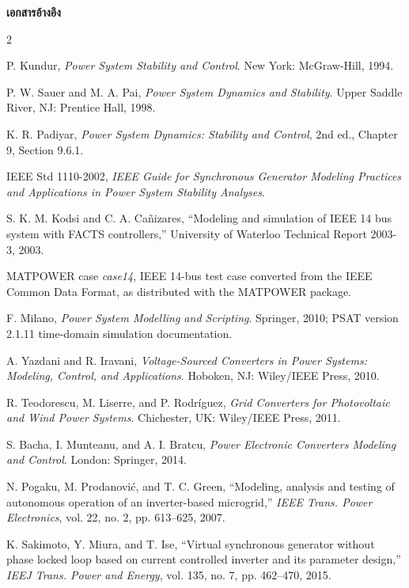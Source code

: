 \documentclass[12pt,a4paper]{article}
\newcommand{\templateheading}[1]{%
  \par\addvspace{0.85em}\noindent
  {\fontsize{19}{21}\selectfont\bfseries #1}\par
  \vspace{0.10em}\noindent{\color{academicblue}\rule{\textwidth}{0.9pt}}\par
  \vspace{0.30em}}
\begin{document}
\templateheading{เอกสารอ้างอิง}
\begin{multicols}{2}\scriptsize
\begin{enumerate}[label={[\arabic*]},leftmargin=1.8em,itemsep=0pt,topsep=0.1em]
\item\label{ref:kundur} P. Kundur, \emph{Power System Stability and Control}. New York: McGraw-Hill, 1994.
\item\label{ref:sauerpai} P. W. Sauer and M. A. Pai, \emph{Power System Dynamics and Stability}. Upper Saddle River, NJ: Prentice Hall, 1998.
\item\label{ref:padiyar} K. R. Padiyar, \emph{Power System Dynamics: Stability and Control}, 2nd ed., Chapter 9, Section 9.6.1.
\item\label{ref:ieee1110} IEEE Std 1110-2002, \emph{IEEE Guide for Synchronous Generator Modeling Practices and Applications in Power System Stability Analyses}.
\item\label{ref:kodsi} S. K. M. Kodsi and C. A. Ca\~{n}izares, ``Modeling and simulation of IEEE 14 bus system with FACTS controllers,'' University of Waterloo Technical Report 2003-3, 2003.
\item\label{ref:matpower} MATPOWER case \emph{case14}, IEEE 14-bus test case converted from the IEEE Common Data Format, as distributed with the MATPOWER package.
\item\label{ref:psat} F. Milano, \emph{Power System Modelling and Scripting}. Springer, 2010; PSAT version 2.1.11 time-domain simulation documentation.
\item\label{ref:yazdani} A. Yazdani and R. Iravani, \emph{Voltage-Sourced Converters in Power Systems: Modeling, Control, and Applications}. Hoboken, NJ: Wiley/IEEE Press, 2010.
\item\label{ref:teodorescu} R. Teodorescu, M. Liserre, and P. Rodr\'{i}guez, \emph{Grid Converters for Photovoltaic and Wind Power Systems}. Chichester, UK: Wiley/IEEE Press, 2011.
\item\label{ref:bacha} S. Bacha, I. Munteanu, and A. I. Bratcu, \emph{Power Electronic Converters Modeling and Control}. London: Springer, 2014.
\item\label{ref:pogaku} N. Pogaku, M. Prodanovi\'{c}, and T. C. Green, ``Modeling, analysis and testing of autonomous operation of an inverter-based microgrid,'' \emph{IEEE Trans. Power Electronics}, vol. 22, no. 2, pp. 613--625, 2007.
\item\label{ref:sakimoto} K. Sakimoto, Y. Miura, and T. Ise, ``Virtual synchronous generator without phase locked loop based on current controlled inverter and its parameter design,'' \emph{IEEJ Trans. Power and Energy}, vol. 135, no. 7, pp. 462--470, 2015.

\end{enumerate}
\end{multicols}
\end{document}
